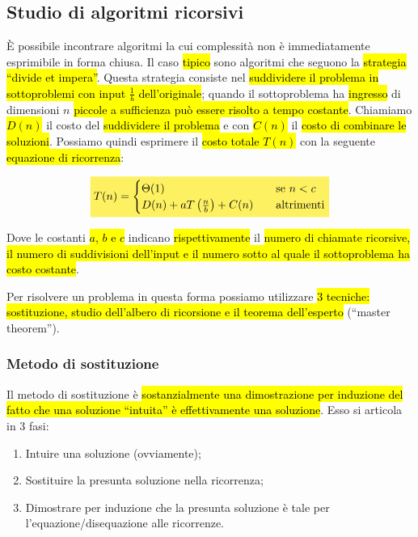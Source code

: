 \documentclass[a4paper,11pt,oneside]{article}
\theoremstyle{plain}
\theoremstyle{definition}
\theoremstyle{remark}
\newcommand{\mhl}[1]{\colorbox{hlcolor}{$\displaystyle #1$}}
\begin{document}
\subsection{Studio di algoritmi ricorsivi}\label{sec:alg-ricorsivi}

È possibile incontrare algoritmi la cui complessità non è immediatamente
esprimibile in forma chiusa. Il caso \hl{tipico} sono algoritmi che seguono la
\hl{strategia ``divide et impera''}. Questa strategia consiste nel
\hl{suddividere il problema in sottoproblemi con input $\frac{1}{b}$
dell'originale}; quando il sottoproblema ha \hl{ingresso} di dimensioni $n$
\hl{piccole a sufficienza può essere risolto a tempo costante}. Chiamiamo
\hl{$D(n)$} il costo del \hl{suddividere il problema} e con \hl{$C(n)$} il
\hl{costo di combinare le soluzioni}. Possiamo quindi esprimere il \hl{costo
totale $T(n)$} con la seguente \hl{equazione di ricorrenza}:

\begin{equation}
  \mhl{
    T(n) =
    \begin{cases}
      \Theta(1)                              & \quad \text{se } n < c \\
      D(n) + aT\left(\frac{n}{b}\right)+C(n) & \quad \text{altrimenti}
    \end{cases}
  }
\end{equation}

Dove le costanti \hl{$a$, $b$ e $c$} indicano \hl{rispettivamente} il \hl{numero
di chiamate ricorsive, il numero di suddivisioni dell'input e il numero sotto al
quale il sottoproblema ha costo costante}.

Per risolvere un problema in questa forma possiamo utilizzare \hl{3 tecniche:
sostituzione, studio dell'albero di ricorsione e il teorema dell'esperto}
(``master theorem'').

\subsubsection{Metodo di sostituzione}\label{sec:alg-ricorsivi-sost}

Il metodo di sostituzione è \hl{sostanzialmente una dimostrazione per induzione
del fatto che una soluzione ``intuita'' è effettivamente una soluzione}. Esso si
articola in 3 fasi:

\begin{enumerate}
  \item Intuire una soluzione (ovviamente);
  \item Sostituire la presunta soluzione nella ricorrenza;
  \item Dimostrare per induzione che la presunta soluzione è tale per
    l'equazione/disequazione alle ricorrenze.
\end{enumerate}
\end{document}
